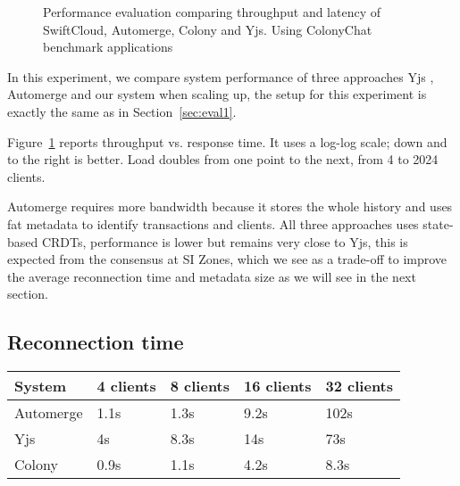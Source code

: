 
\begin{figure}
    \begin{center}
        \scalebox{0.7}{}
    \end{center}
    \caption{Performance evaluation comparing throughput and latency of SwiftCloud, Automerge, Colony and Yjs. Using ColonyChat benchmark applications}
    \label{fig:plot-performance-soa}
\end{figure}

In this experiment, we compare system performance of three approaches
Yjs \cite{yjsyjsSh56:online}, 
Automerge \cite{kleppmann2018automerge} and our system \system{} when scaling up,
the setup for this experiment is exactly the same as in Section~\ref{sec:eval1}.

Figure~\ref{fig:plot-performance-soa} reports throughput vs. response time.
It uses a log-log scale;
down and to the right is better.
Load doubles from one point to the next, from 4 to 2024 clients.

Automerge requires more bandwidth because it stores the whole history and uses
fat metadata to identify transactions and clients.
All three approaches uses state-based CRDTs, 
\system{} performance is lower but remains very close to Yjs, 
this is expected from the consensus at SI Zones,
which we see as a trade-off to improve the average reconnection time and 
metadata size as we will see in the next section.

\subsection{Reconnection time}

\begin{center}
    \begin{table}[h]
    \begin{tabular}{ |m{6em}||m{5em}|m{5em}|m{5em}|m{5em}| } 
        \hline
        System & 4 clients & 8 clients & 16 clients & 32 clients\\ 
        \hline
        Automerge & 1.1s & 1.3s & 9.2s & 102s \\ 
        \hline
        Yjs & 4s & 8.3s & 14s & 73s \\ 
        \hline
        Colony & 0.9s & 1.1s & 4.2s & 8.3s \\ 
        \hline
    \end{tabular}
\end{table}
\end{center}

